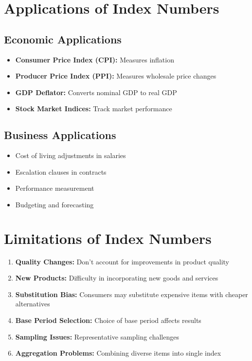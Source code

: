 \documentclass[twoside]{book}
\begin{document}
\section{Applications of Index Numbers}

\subsection{Economic Applications}
\begin{itemize}
    \item \textbf{Consumer Price Index (CPI):} Measures inflation
    \item \textbf{Producer Price Index (PPI):} Measures wholesale price changes
    \item \textbf{GDP Deflator:} Converts nominal GDP to real GDP
    \item \textbf{Stock Market Indices:} Track market performance
\end{itemize}

\subsection{Business Applications}
\begin{itemize}
    \item Cost of living adjustments in salaries
    \item Escalation clauses in contracts
    \item Performance measurement
    \item Budgeting and forecasting
\end{itemize}

\section{Limitations of Index Numbers}

\begin{enumerate}
    \item \textbf{Quality Changes:} Don't account for improvements in product quality
    \item \textbf{New Products:} Difficulty in incorporating new goods and services
    \item \textbf{Substitution Bias:} Consumers may substitute expensive items with cheaper alternatives
    \item \textbf{Base Period Selection:} Choice of base period affects results
    \item \textbf{Sampling Issues:} Representative sampling challenges
    \item \textbf{Aggregation Problems:} Combining diverse items into single index
\end{enumerate}
\end{document}
